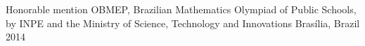 


\begin{cvhonors}

  \cvhonor
    {Honorable mention} %
    {OBMEP, Brazilian Mathematics Olympiad of Public Schools, by INPE and the Ministry of Science, Technology and Innovations} %
    {Brasília, Brazil} %
    {2014} %

\end{cvhonors}
